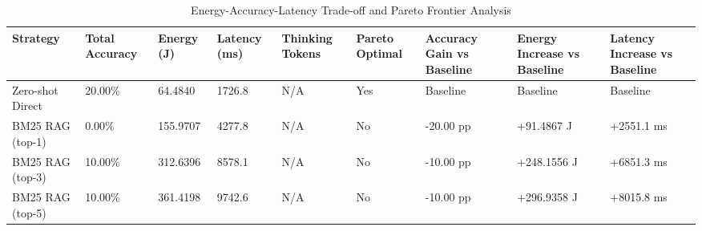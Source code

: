 \begin{table}
\caption{Energy-Accuracy-Latency Trade-off and Pareto Frontier Analysis}
\label{tab:tradeoff_comparison}
\begin{tabular}{lllllllll}
\toprule
Strategy & Total Accuracy & Energy (J) & Latency (ms) & Thinking Tokens & Pareto Optimal & Accuracy Gain vs Baseline & Energy Increase vs Baseline & Latency Increase vs Baseline \\
\midrule
Zero-shot Direct & 20.00\% & 64.4840 & 1726.8 & N/A & Yes & Baseline & Baseline & Baseline \\
BM25 RAG (top-1) & 0.00\% & 155.9707 & 4277.8 & N/A & No & -20.00 pp & +91.4867 J & +2551.1 ms \\
BM25 RAG (top-3) & 10.00\% & 312.6396 & 8578.1 & N/A & No & -10.00 pp & +248.1556 J & +6851.3 ms \\
BM25 RAG (top-5) & 10.00\% & 361.4198 & 9742.6 & N/A & No & -10.00 pp & +296.9358 J & +8015.8 ms \\
\bottomrule
\end{tabular}
\end{table}
